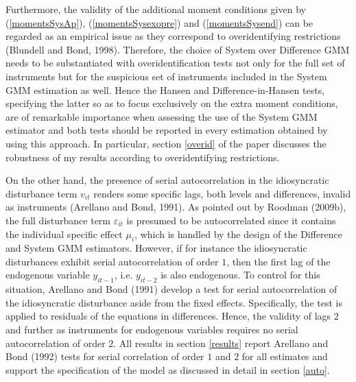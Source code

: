 \documentclass[12pt,a4paper,english]{article}%
\begin{document}
Furthermore, the validity of the additional moment conditions given by (\ref{momentsSysAp}), (\ref{momentsSysexopre}) and (\ref{momentsSysend}) can be regarded as an empirical issue as they correspond to overidentifying restrictions (Blundell and Bond, 1998). Therefore, the choice of System over Difference GMM needs to be substantiated with overidentification tests not only for the full set of instruments but for the suspicious set of instruments included in the System GMM estimation as well. Hence the Hansen and Difference-in-Hansen tests, specifying the latter so as to focus exclusively on the extra moment conditions, are of remarkable importance when assessing the use of the System GMM estimator and both tests should be reported in every estimation obtained by using this approach. In particular, section \ref{overid} of the paper discusses the robustness of my results according to overidentifying restrictions.

On the other hand, the presence of serial autocorrelation in the idiosyncratic disturbance term $v_{it}$ renders some specific lags, both levels and differences, invalid as instruments (Arellano and Bond, 1991). As pointed out by Roodman (2009b), the full disturbance term $\varepsilon_{it}$ is presumed to be autocorrelated since it contains the individual specific effect $\mu_i$, which is handled by the design of the Difference and System GMM estimators. However, if for instance the idiosyncratic disturbances exhibit serial autocorrelation of order $1$, then the first lag of the endogenous variable $y_{it-1}$, i.e. $y_{it-2}$ is also endogenous. To control for this situation, Arellano and Bond (1991) develop a test for serial autocorrelation of the idiosyncratic disturbance aside from the fixed effects. Specifically, the test is applied to residuals of the equations in differences. Hence, the validity of lags $2$ and further as instruments for endogenous variables requires no serial autocorrelation of order $2$. All results in section \ref{results} report Arellano and Bond (1992) tests for serial correlation of order $1$ and $2$ for all estimates and support the specification of the model as discussed in detail in section \ref{auto}.
\end{document}
